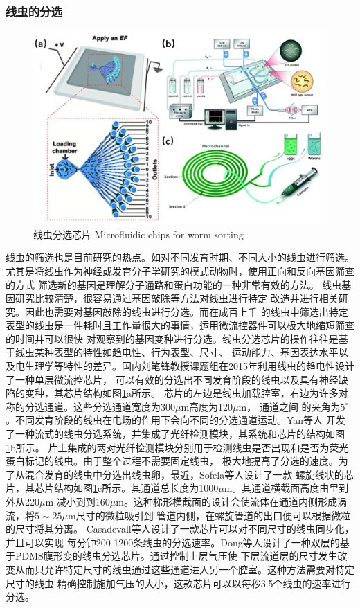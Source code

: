 \subsubsection{线虫的分选}
\label{sec:intro:analog}
	\begin{figure}[t]
	  \centering
	  \includegraphics[width=12cm]{figure/chap1/sorting.jpg}
	  \bicaption
		{线虫分选芯片}
		{Microfluidic chips for worm sorting}
	  \label{fig:sorting}
	\end{figure}
	线虫的筛选也是目前研究的热点。如对不同发育时期、不同大小的线虫进行筛选。
	尤其是将线虫作为神经或发育分子学研究的模式动物时，使用正向和反向基因筛查的方式
	筛选新的基因是理解分子通路和蛋白功能的一种非常有效的方法。
	线虫基因研究比较清楚，很容易通过基因敲除等方法对线虫进行特定
	改造并进行相关研究。因此也需要对基因敲除的线虫进行分选。而在成百上千
	的线虫中筛选出特定表型的线虫是一件耗时且工作量很大的事情，运用微流控器件可以极大地缩短筛查的时间并可以很快
	对观察到的基因变种进行分选。线虫分选芯片的操作往往是基于线虫某种表型的特性如趋电性、行为表型、尺寸、
	运动能力、基因表达水平以及电生理学等特性的差异。国内刘笔锋教授课题组在2015年利用线虫的趋电性设计了一种单层微流控芯片\cite{wang2015highly}，
	可以有效的分选出不同发育阶段的线虫以及具有神经缺陷的变种，其芯片结构如图\ref{fig:sorting}a所示。
	芯片的左边是线虫加载腔室，右边为许多对称的分选通道。这些分选通道宽度为300$\mu$m高度为120$\mu$m，
	通道之间
	的夹角为$5^\circ$。不同发育阶段的线虫在电场的作用下会向不同的分选通道运动。Yan等人\cite{yan2014continuous}
	开发了一种流式的线虫分选系统，并集成了光纤检测模块，其系统和芯片的结构如图\ref{fig:sorting}b所示。
	片上集成的两对光纤检测模块分别用于检测线虫是否出现和是否为荧光蛋白标记的线虫。由于整个过程不需要固定线虫，
	极大地提高了分选的速度。为了从混合发育的线虫中分选出线虫卵，最近，Sofela等人\cite{sofela2018high}设计了一款
	螺旋线状的芯片，其芯片结构如图\ref{fig:sorting}c所示。其通道总长度为1000$\mu$m。其通道横截面高度由里到外从220$\mu$m
	减小到到160$\mu$m。这种梯形横截面的设计会使流体在通道内侧形成涡流，将$5\sim25\mu$m尺寸的微粒吸引到
	管道内侧，在螺旋管道的出口便可以根据微粒的尺寸将其分离。
	Casadevall\cite{Casadevall2011High}等人设计了一款芯片可以对不同尺寸的线虫同步化，并且可以实现
	每分钟200-1200条线虫的分选速率。Dong\cite{dong2016versatile}等人设计了一种双层的基于PDMS膜形变的线虫分选芯片。通过控制上层气压使
	下层流道层的尺寸发生改变从而只允许特定尺寸的线虫通过这些通道进入另一个腔室。这种方法需要对特定尺寸的线虫
	精确控制施加气压的大小，这款芯片可以以每秒3.5个线虫的速率进行分选。

